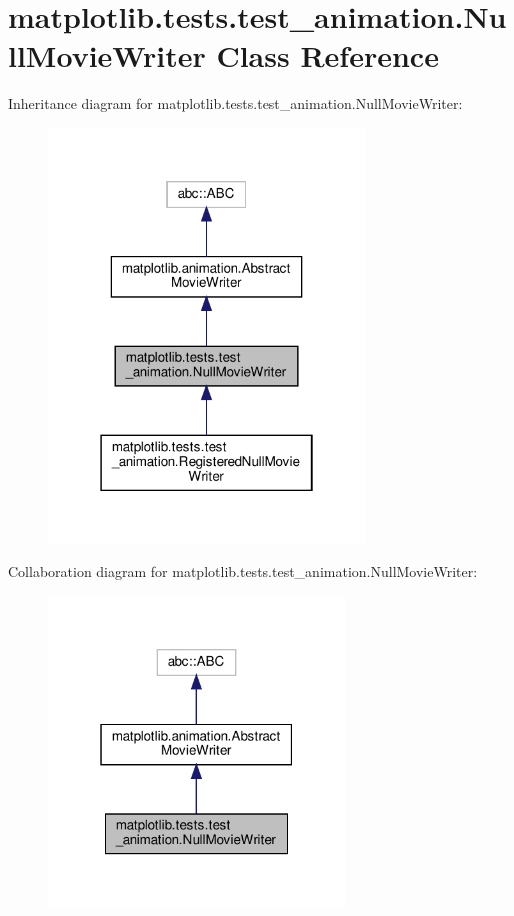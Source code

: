 \hypertarget{classmatplotlib_1_1tests_1_1test__animation_1_1NullMovieWriter}{}\section{matplotlib.\+tests.\+test\+\_\+animation.\+Null\+Movie\+Writer Class Reference}
\label{classmatplotlib_1_1tests_1_1test__animation_1_1NullMovieWriter}


Inheritance diagram for matplotlib.\+tests.\+test\+\_\+animation.\+Null\+Movie\+Writer\+:
\nopagebreak
\begin{figure}[H]
\begin{center}
\leavevmode
\includegraphics[width=238pt]{classmatplotlib_1_1tests_1_1test__animation_1_1NullMovieWriter__inherit__graph}
\end{center}
\end{figure}


Collaboration diagram for matplotlib.\+tests.\+test\+\_\+animation.\+Null\+Movie\+Writer\+:
\nopagebreak
\begin{figure}[H]
\begin{center}
\leavevmode
\includegraphics[width=223pt]{classmatplotlib_1_1tests_1_1test__animation_1_1NullMovieWriter__coll__graph}
\end{center}
\end{figure}
